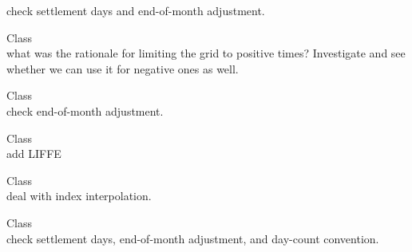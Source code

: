 \begin{DoxyRefList}
\label{todo__todo000032}%
%
check settlement days and end-\/of-\/month adjustment.  
\item[Class \doxylink{class_quant_lib_1_1_time_grid}{Quant\+Lib\+::Time\+Grid} ]\hfill \\
\label{todo__todo000078}%
%
what was the rationale for limiting the grid to positive times? Investigate and see whether we can use it for negative ones as well.  
\item[Class \doxylink{class_quant_lib_1_1_t_r_libor}{Quant\+Lib\+::TRLibor} ]\hfill \\
\label{todo__todo000033}%
%
check end-\/of-\/month adjustment.  
\item[Class \doxylink{class_quant_lib_1_1_united_kingdom}{Quant\+Lib\+::United\+Kingdom} ]\hfill \\
\label{todo__todo000077}%
%
add LIFFE 
\item[Class \doxylink{class_quant_lib_1_1_yo_y_cap_floor_term_price_surface}{Quant\+Lib\+::Yo\+YCap\+Floor\+Term\+Price\+Surface} ]\hfill \\
\label{todo__todo000027}%
%
deal with index interpolation.  
\item[Class \doxylink{class_quant_lib_1_1_zibor}{Quant\+Lib\+::Zibor} ]\hfill \\
\label{todo__todo000034}%
%
check settlement days, end-\/of-\/month adjustment, and day-\/count convention. 
\end{DoxyRefList}